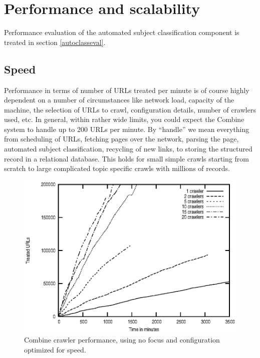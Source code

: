 \section{Performance and scalability}
\label{performance}

Performance evaluation of the automated subject classification component is
treated in section \ref{autoclasseval}.

\subsection{Speed}

Performance in terms of number of URLs treated per minute is of course
highly dependent on a number of circumstances like network load,
capacity of the machine, the selection of URLs to crawl, configuration
details, number of crawlers used, etc.
In general, within rather wide limits, you could expect the Combine
system to handle up to 200 URLs per
minute. By ``handle'' we mean everything from scheduling of URLs, fetching
 pages over the network, parsing the page,
automated subject classification, recycling of new links, to storing the structured record in
a relational database. This holds for small simple crawls starting
from scratch to large complicated topic specific crawls with millions
of records.

\begin{figure}[htb]
\begin{center}
 \includegraphics[height=0.4\textheight]{CrawlerSpeed.ps}
\end{center}
\caption{Combine crawler performance, using no focus and configuration optimized for speed.}
\label{crawlspeed}
\end{figure}

